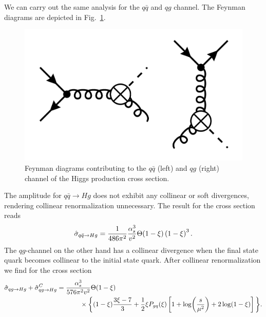 We can carry out the same analysis for the $q \bar{q}$ and $q g$ channel. The Feynman diagrams are depicted in Fig.~\ref{fig:4:qqHg}.
\begin{figure}[h]
\centering
\includegraphics[scale=0.15]{Images/NLO_Feynman_diagrams/qqHg.pdf}
\caption{Feynman diagrams contributing to the $q \bar{q}$ (left) and $q g$ (right) channel of the Higgs production cross section.}
\label{fig:4:qqHg}
\end{figure}
The amplitude for $q \bar{q} \rightarrow H g$ does not exhibit any collinear or soft divergences, rendering collinear renormalization unnecessary. The result for the cross section reads
\begin{equation}
\hat{\sigma}_{q \bar{q} \rightarrow H g} = \frac{1}{486 \pi^2} \frac{\alpha_s^3}{v^2} \Theta (1 - \xi) \left(1 - \xi \right)^3.
\end{equation}
The $qg$-channel on the other hand has a collinear divergence when the final state quark becomes collinear to the initial state quark. After collinear renormalization we find for the cross section
\begin{equation}
\begin{split}
&\hat{\sigma}_{qg \rightarrow Hg} + \hat{\sigma}_{qg \rightarrow Hg}^C = \frac{\alphas^3}{576 \pi^2 v^2} \Theta (1 - \xi) \\
& \hspace{4cm} \times \bigg \lbrace (1 - \xi) \frac{3 \xi - 7}{3} + \frac{1}{2} \xi P_{gq}(\xi) \left[1 + \log\!\left(\frac{s}{\mu^2} \right) +2 \log\!\left(1 - \xi \right) \right] \bigg \rbrace.
\end{split}
\end{equation}

